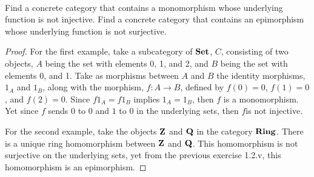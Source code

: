 \documentclass[main.tex]{subfiles}
\begin{document}
\paragraph{}
\begin{exercise}
	Find a concrete category that contains a monomorphism whose underlying
	function is not injective. Find a concrete category that contains an
	epimorphism whose underlying function is not surjective.
\end{exercise}

\begin{proof}
	For the first example, take a subcategory of $\bold {Set}$, $C$, consisting
	of two objects, $A$ being the set with elements 0, 1, and 2, and $B$ being
	the set with elements 0, and 1. Take as morphisms between $A$ and $B$ the
	identity morphisms, $1_A$ and $1_B$, along with the morphism, $f : A
	\rightarrow B$, defined by $f(0) = 0$, $f(1) = 0$, and $f(2) = 0$. Since
	$f1_A = f1_B$ implies $1_A = 1_B$, then $f$ is a monomorphism. Yet since $f$
	sends $0$ to $0$ and $1$ to $0$ in the underlying sets, then $f$is not
	injective.

	For the second example, take the objects $\bold Z$ and $\bold Q$ in the
	category $\bold {Ring}$. There is a unique ring homomorphism between $\bold
	Z$ and $\bold Q$. This homomorphism is not surjective on the underlying sets,
	yet from the previous exercise 1.2.v, this homomorphism is an epimorphism.
\end{proof}
\end{document}
